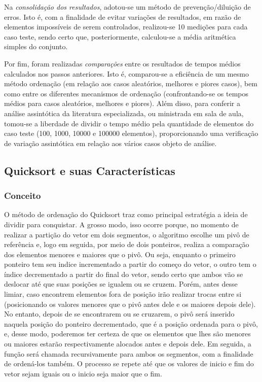 \documentclass[a4paper, 12pt]{article}
\begin{document}
Na \textit{consolidação dos resultados}, adotou-se um método de prevenção/diluição de erros. Isto é, com a finalidade de evitar variações de resultados, em razão de elementos impossíveis de serem controlados, realizou-se 10 medições para cada caso teste, sendo certo que, posteriormente, calculou-se a média aritmética simples do conjunto.

Por fim, foram realizadas \textit{comparações} entre os resultados de tempos médios calculados nos passos anteriores. Isto é, comparou-se a eficiência de um mesmo método ordenação (em relação aos casos aleatórios, melhores e piores casos), bem como entre os diferentes mecanismos de ordenação (confrontando-se os tempos médios para casos aleatórios, melhores e piores).  Além disso, para conferir a análise assintótica da literatura especializada, ou ministrada em sala de aula, tomou-se a liberdade de dividir o tempo médio pela quantidade de elementos do caso teste (100, 1000, 10000 e 100000 elementos), proporcionando uma verificação de variação assintótica em relação aos vários casos objeto de análise.


\subsection{Quicksort e suas Características}

\subsubsection{Conceito}
\tab O método de ordenação do Quicksort traz como principal estratégia a ideia de dividir para conquistar. A grosso modo, isso ocorre porque, no momento de realizar a partição do vetor em dois segmentos, o algoritmo escolhe um pivô de referência e, logo em seguida, por meio de dois ponteiros, realiza a comparação dos elementos menores e maiores que o pivô. Ou seja, enquanto o primeiro ponteiro tem seu indice incrementado a partir do começo do vetor, o outro tem o índice decrementado a partir do final do vetor, sendo certo que ambos vão se deslocar até que suas posições se igualem ou se cruzem. Porém, antes desse limiar, caso encontrem elementos fora de posição irão realizar trocas entre si (posicionando os valores menores que o pivô antes dele e os maiores depois dele). No entanto, depois de se encontrarem ou se cruzarem, o pivô será inserido naquela posição do ponteiro decrementado, que é a posição ordenada para o pivô, e, desse modo, poderemos ter certeza de que os elementos que lhes são menores ou maiores estarão respectivamente alocados antes e depois dele. Em seguida, a função será chamada recursivamente para ambos os segmentos, com a finalidade de ordená-los também. O processo se repete até que os valores de inicio e fim do vetor sejam iguais ou o inicio seja maior que o fim.
\end{document}
